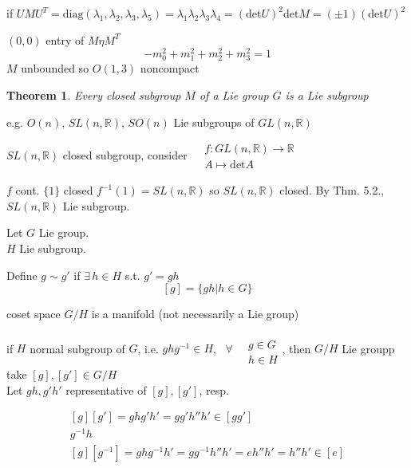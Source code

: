 \documentclass{book}
\newtheorem{theorem}{Theorem}
\begin{document}
if $UMU^T = \text{diag}{ ( \lambda_1, \lambda_2, \lambda_3, \lambda_5) } = \lambda_1 \lambda_2 \lambda_3 \lambda_4 = (\text{det}{U})^2 \text{det}{M} = (\pm 1) (\text{det}{U} )^2$

$(0,0)$ entry of $M\eta M^T$
\[
-m_0^2 + m_1^2 + m_2^2 + m_3^2 = 1 
\]$M$ unbounded so $O(1,3)$ noncompact

\begin{theorem}{5.2} Every closed subgroup $M$ of a Lie group $G$ is a Lie subgroup
\end{theorem}

e.g. $O(n)$, $SL(n,\mathbb{R})$, $SO(n)$ Lie subgroups of $GL(n,\mathbb{R})$

$SL(n,\mathbb{R})$ closed subgroup, consider $ \begin{aligned} & f: GL(n, \mathbb{R}) \to \mathbb{R} \\ 
  & A \mapsto \text{det}{A} \end{aligned}$

$f$ cont. $\lbrace 1 \rbrace$ closed $f^{-1}(1) = SL(n,\mathbb{R})$ so $SL(n,\mathbb{R})$ closed.  By Thm. 5.2., $SL(n, \mathbb{R}) $ Lie subgroup. 

Let $G$ Lie group. \\
\phantom{Let } $H$ Lie subgroup.

Define $g\sim g'$ if $\exists \, h \in H$ s.t. $g' = gh$ 
\[
[g] = \lbrace gh | h \in G \rbrace
\]

coset space $G /H$ is a manifold (not necessarily a Lie group)

if $H$ normal subgroup of $G$, i.e. $ghg^{-1} \in H$, \, $\forall \, \begin{aligned} & \\ 
  & g \in G \\
  & h \in H \end{aligned}$, then $G/H$ Lie groupp \\

take $[g], [g'] \in G/H$ \\
Let $gh, g'h'$ representative of $[g], [g']$, resp. 

\[
\begin{gathered}
  [g][g'] = gh g'h' = gg' h'' h' \in [gg'] \\ 
  g^{-1} h \\
  [g][g^{-1} ] = gh g^{-1} h' = gg^{-1} h'' h' = e h'' h' = h'' h' \in [e]
\end{gathered}
\]
\end{document}
